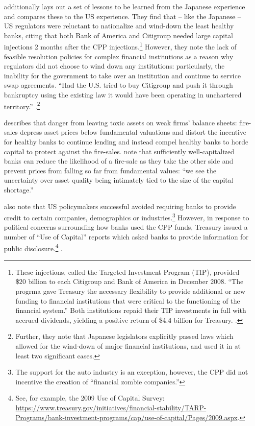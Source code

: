\documentclass[12pt]{article}
\begin{document}
\citet{Hoshi} additionally lays out a set of lessons to be learned from the Japanese experience and compares these to the US experience. They find that -- like the Japanese -- US regulators were reluctant to nationalize and wind-down the least healthy banks, citing that both Bank of America and Citigroup needed large capital injections 2 months after the CPP injections.\footnote{These injections, called the Targeted Investment Program (TIP), provided \$20 billion to each Citigroup and Bank of America in December 2008. ``The progrma gave Treasury the necessary flexibility to provide additional or new funding to financial institutions that were critical to the functioning of the financial system.'' Both institutions repaid their TIP investments in full with accrued dividends, yielding a positive return of \$4.4 billion for Treasury. \citep{TIP}.} However, they note the lack of feasible resolution policies for complex financial institutions as a reason why regulators did not choose to wind down any institutions: particularly, the inability for the government to take over an institution and continue to service swap agreements. ``Had the U.S. tried to buy Citigroup and push it through bankruptcy using the existing law it would have been operating in unchartered territory.'' \citep{Hoshi}.\footnote{Further, they note that Japanese legislators explicitly passed laws which allowed for the wind-down of major financial institutions, and used it in at least two significant cases.} 

\citet{Diamond} describes that danger from leaving toxic assets on weak firms' balance sheets: fire-sales depress asset prices below fundamental valuations and distort the incentive for healthy banks to continue lending and instead compel healthy banks to horde capital to protect against the fire-sales. \citet{Hoshi} note that sufficiently well-capitalized banks can reduce the likelihood of a fire-sale as they take the other side and prevent prices from falling so far from fundamental values: ``we see the uncertainty over asset quality being intimately tied to the size of the capital shortage.'' 

\citet{Hoshi} also note that US policymakers successful avoided requiring banks to provide credit to certain companies, demographics or industries.\footnote{The support for the auto industry is an exception, however, the CPP did not incentive the creation of ``financial zombie companies.''} However, in response to political concerns surrounding how banks used the CPP funds, Treasury issued a number of ``Use of Capital'' reports which asked banks to provide information for public disclosure.\footnote{See, for example, the 2009 Use of Capital Survey: \url{https://www.treasury.gov/initiatives/financial-stability/TARP-Programs/bank-investment-programs/cap/use-of-capital/Pages/2009.aspx}.} \citep{Bernanke}. 
\end{document}
